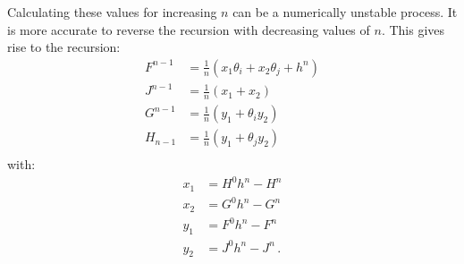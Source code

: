 Calculating these values for increasing $n$ can be a numerically unstable process. It is more accurate to
reverse the recursion with decreasing values of $n$. This gives rise to the recursion:
\begin{align*}
  F^{n-1} & = \frac{1}{n}\left( x_1 \theta_i + x_2 \theta_j + h^n \right) \\
  J^{n-1} & = \frac{1}{n}\left( x_1  + x_2\right)                         \\
  G^{n-1} & = \frac{1}{n}\left( y_1  + \theta_i y_2\right)                \\
  H_{n-1} & = \frac{1}{n}\left( y_1  + \theta_j y_2\right)                \\
\end{align*}
with:
\begin{align*}
  x_1 & = H^{0} h^n - H^n        \\
  x_2 & = G^0 h^n - G^n          \\
  y_1 & = F^{0} h^n - F^{n}      \\
  y_2 & = J^{0} h^n - J^{n}  \,. \\
\end{align*}

